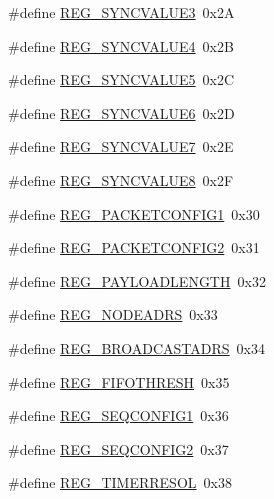 \begin{DoxyCompactItemize}
\#define \mbox{\hyperlink{sx1276_regs-_fsk_8h_af89062529e96d32eecd0f89963d52adf}{R\+E\+G\+\_\+\+S\+Y\+N\+C\+V\+A\+L\+U\+E3}}~0x2A
\item 
\#define \mbox{\hyperlink{sx1276_regs-_fsk_8h_a9768416ceaebbdeab3fee291f351a98f}{R\+E\+G\+\_\+\+S\+Y\+N\+C\+V\+A\+L\+U\+E4}}~0x2B
\item 
\#define \mbox{\hyperlink{sx1276_regs-_fsk_8h_a834570d54f8b7370a5d42fc180650c14}{R\+E\+G\+\_\+\+S\+Y\+N\+C\+V\+A\+L\+U\+E5}}~0x2C
\item 
\#define \mbox{\hyperlink{sx1276_regs-_fsk_8h_a4e2e2802416f6a445a355828764363e2}{R\+E\+G\+\_\+\+S\+Y\+N\+C\+V\+A\+L\+U\+E6}}~0x2D
\item 
\#define \mbox{\hyperlink{sx1276_regs-_fsk_8h_ac276ab640ba22f4edb9cc206567f1e22}{R\+E\+G\+\_\+\+S\+Y\+N\+C\+V\+A\+L\+U\+E7}}~0x2E
\item 
\#define \mbox{\hyperlink{sx1276_regs-_fsk_8h_ab29ed95bcf10e2b561a2400806344f81}{R\+E\+G\+\_\+\+S\+Y\+N\+C\+V\+A\+L\+U\+E8}}~0x2F
\item 
\#define \mbox{\hyperlink{sx1276_regs-_fsk_8h_a035c91c3eea7209c78ac5bda775940cc}{R\+E\+G\+\_\+\+P\+A\+C\+K\+E\+T\+C\+O\+N\+F\+I\+G1}}~0x30
\item 
\#define \mbox{\hyperlink{sx1276_regs-_fsk_8h_a519d7b5db6ab8bb6013226eaef9756c8}{R\+E\+G\+\_\+\+P\+A\+C\+K\+E\+T\+C\+O\+N\+F\+I\+G2}}~0x31
\item 
\#define \mbox{\hyperlink{sx1276_regs-_fsk_8h_ac1f66aa74c41653c8d30ce6b92af3769}{R\+E\+G\+\_\+\+P\+A\+Y\+L\+O\+A\+D\+L\+E\+N\+G\+TH}}~0x32
\item 
\#define \mbox{\hyperlink{sx1276_regs-_fsk_8h_aa62099ad5a5d4b5967f1ded180d5f685}{R\+E\+G\+\_\+\+N\+O\+D\+E\+A\+D\+RS}}~0x33
\item 
\#define \mbox{\hyperlink{sx1276_regs-_fsk_8h_a5c96b6f1a3e95a80f700d3a0c8ed5742}{R\+E\+G\+\_\+\+B\+R\+O\+A\+D\+C\+A\+S\+T\+A\+D\+RS}}~0x34
\item 
\#define \mbox{\hyperlink{sx1276_regs-_fsk_8h_a18b41b1ddfbe6eb514f74431b5d76792}{R\+E\+G\+\_\+\+F\+I\+F\+O\+T\+H\+R\+E\+SH}}~0x35
\item 
\#define \mbox{\hyperlink{sx1276_regs-_fsk_8h_aed3f5e12a0c953d12aacbc1146f2dde8}{R\+E\+G\+\_\+\+S\+E\+Q\+C\+O\+N\+F\+I\+G1}}~0x36
\item 
\#define \mbox{\hyperlink{sx1276_regs-_fsk_8h_a93a8f2fecd93790802eab65f9685dfb6}{R\+E\+G\+\_\+\+S\+E\+Q\+C\+O\+N\+F\+I\+G2}}~0x37
\item 
\#define \mbox{\hyperlink{sx1276_regs-_fsk_8h_a92529ed06adfae1625c5300057a88f23}{R\+E\+G\+\_\+\+T\+I\+M\+E\+R\+R\+E\+S\+OL}}~0x38

\end{DoxyCompactItemize}
